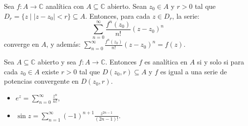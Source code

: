 \documentclass[spanish,presentation]{beamer}
\begin{document}
\begin{frame}[label=sec-3-1]{}
\begin{theorem}[Taylor]
Sea \(f\colon A\to \mathbb{C}\) analítica con \(A\subseteq
    \mathbb{C}\) abierto. Sean \(z_{0}\in A\) y \(r>0\) tal que
\(D_{r}=\{z\mid |z-z_{0}|<r\}\subseteq A\). Entonces, para cada
\(z\in D_{r}\), la serie:
\begin{displaymath}
\sum_{n=0}^{\infty} \frac{f^{n}(z_{0})}{n!}(z-z_{0})^{n}
\end{displaymath}
converge en \(A\), y además: \(\sum_{n=0}^{\infty}
    \frac{f^{n}(z_{0})}{n!}(z-z_{0})^{n}=f(z)\).
\end{theorem}
\end{frame}

\begin{frame}[label=sec-3-2]{}
\begin{corollary}
Sea \(A\subseteq \mathbb{C}\) abierto y sea \(f\colon A\to
    \mathbb{C}\). Entonces \(f\) es analítica en \(A\) si y solo si
para cada \(z_{0}\in A\) existe \(r>0\) tal que
\(D(z_{0},r)\subseteq A\) y \(f\) es igual a una serie de
potencias convergente en \(D(z_{0},r)\).
\end{corollary}

\begin{block}{}
\begin{itemize}
\item \(e^{z}=\sum_{n=0}^{\infty}\frac{z^{n}}{n!}\),
\item \(\sin z=\sum_{n=1}^{\infty}(-1)^{n+1}\frac{z^{2n-1}}{(2n-1)!}\).
\end{itemize}
\end{block}
\end{frame}
\end{document}

